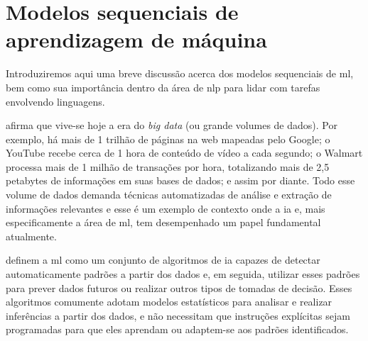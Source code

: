 \section{Modelos sequenciais de aprendizagem de máquina}
\label{sec:modelos-sequenciais}

Introduziremos aqui uma breve discussão acerca dos modelos sequenciais de \acrlong{ml}, bem como sua importância dentro da área de \acrfull{nlp} para lidar com tarefas envolvendo linguagens.



 afirma que vive-se hoje a era do \textit{big data} (ou grande volumes de dados).
Por exemplo, há mais de 1 trilhão de páginas na web mapeadas pelo Google; o YouTube recebe cerca de 1 hora de conteúdo de vídeo a cada segundo; o Walmart processa mais de 1 milhão de transações por hora, totalizando mais de 2,5 petabytes de informações em suas bases de dados; e assim por diante.
Todo esse volume de dados demanda técnicas automatizadas de análise e extração de informações relevantes e esse é um exemplo de contexto onde a \acrfull{ia} e, mais especificamente a área de \acrfull{ml}, tem desempenhado um papel fundamental atualmente.

 definem a \acrlong{ml} como um conjunto de algoritmos de \acrshort{ia} capazes de detectar automaticamente padrões a partir dos dados e, em seguida, utilizar esses padrões para prever dados futuros ou realizar outros tipos de tomadas de decisão.
Esses algoritmos comumente adotam modelos estatísticos para analisar e realizar inferências a partir dos dados, e não necessitam que instruções explícitas sejam programadas para que eles aprendam ou adaptem-se aos padrões identificados.



